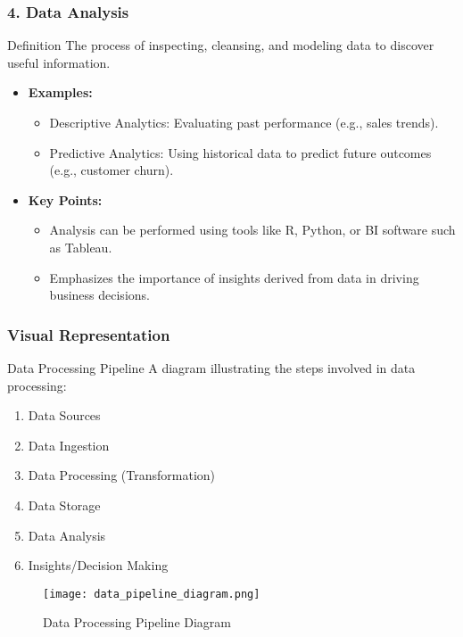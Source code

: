 \documentclass[aspectratio=169]{beamer}
\begin{document}
\begin{frame}[fragile]
    \frametitle{4. Data Analysis}
    \begin{block}{Definition}
        The process of inspecting, cleansing, and modeling data to discover useful information.
    \end{block}
    \begin{itemize}
        \item \textbf{Examples:}
        \begin{itemize}
            \item Descriptive Analytics: Evaluating past performance (e.g., sales trends).
            \item Predictive Analytics: Using historical data to predict future outcomes (e.g., customer churn).
        \end{itemize}
        \item \textbf{Key Points:}
        \begin{itemize}
            \item Analysis can be performed using tools like R, Python, or BI software such as Tableau.
            \item Emphasizes the importance of insights derived from data in driving business decisions.
        \end{itemize}
    \end{itemize}
\end{frame}

\begin{frame}[fragile]
    \frametitle{Visual Representation}
    \begin{block}{Data Processing Pipeline}
        A diagram illustrating the steps involved in data processing:
        \begin{enumerate}
            \item Data Sources
            \item Data Ingestion
            \item Data Processing (Transformation)
            \item Data Storage
            \item Data Analysis
            \item Insights/Decision Making
        \end{enumerate}
    \end{block}
    \begin{figure}
        \centering
        \texttt{[image: data\_pipeline\_diagram.png]} %
        \caption{Data Processing Pipeline Diagram}
    \end{figure}
\end{frame}
\end{document}
